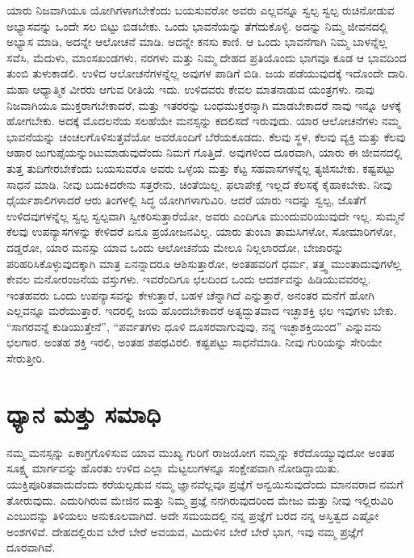 ಯಾರು ನಿಜವಾಗಿಯೂ ಯೋಗಿಗಳಾಗಬೇಕೆಂದು ಬಯಸುವರೋ ಅವರು ಎಲ್ಲವನ್ನೂ ಸ್ವಲ್ಪ ಸ್ವಲ್ಪ ರುಚಿನೋಡುವ ಅಭ್ಯಾಸವನ್ನು ಒಂದೇ ಸಲ ಬಿಟ್ಟು ಬಿಡಬೇಕು. ಒಂದು ಭಾವನೆಯನ್ನು ತೆಗೆದುಕೊಳ್ಳಿ. ಅದನ್ನು ನಿಮ್ಮ ಜೀವನದಲ್ಲಿ ಅಭ್ಯಾಸ ಮಾಡಿ, ಅದನ್ನೇ ಆಲೋಚನೆ ಮಾಡಿ. ಅದನ್ನೇ ಕನಸು ಕಾಣಿ. ಆ ಒಂದು ಭಾವನೆಗಾಗಿ ನಿಮ್ಮ ಬಾಳನ್ನೆಲ್ಲ ಸವೆಸಿ, ಮೆದುಳು, ಮಾಂಸಖಂಡಗಳು, ನರಗಳು ಮತ್ತು ನಿಮ್ಮ ದೇಹದ ಪ್ರತಿಯೊಂದು ಭಾಗವೂ ಕೂಡ ಆ ಭಾವದಿಂದ ತುಂಬಿ ತುಳುಕಾಡಲಿ. ಉಳಿದ ಆಲೋಚನೆಗಳನ್ನೆಲ್ಲ ಅವುಗಳ ಪಾಡಿಗೆ ಬಿಡಿ. ಜಯ ಪಡೆಯುವುದಕ್ಕೆ ಇದೊಂದೇ ದಾರಿ. ಮಹಾ ಆಧ್ಯಾತ್ಮಿಕ ವೀರರು ಆಗುವ ರೀತಿಯೆ ಇದು. ಉಳಿದವರು ಕೇವಲ ಮಾತನಾಡುವ ಯಂತ್ರಗಳು. ನಾವು ನಿಜವಾಗಿಯೂ ಮುಕ್ತರಾಗಬೇಕಾದರೆ, ಮತ್ತು ಇತರರನ್ನು ಬಂಧಮುಕ್ತರನ್ನಾಗಿ ಮಾಡಬೇಕಾದರೆ ನಾವು ಇನ್ನೂ ಆಳಕ್ಕೆ ಹೋಗಬೇಕು. ಅದಕ್ಕೆ ಮೊದಲನೆಯ ಸಲಹೆಯೇ ಮನಸ್ಸನ್ನು ಕದಲಿಸದೆ ಇರುವುದು. ಯಾರ ಆಲೋಚನೆಗಳು ನಮ್ಮ ಭಾವನೆಯನ್ನು ಚಂಚಲಗೊಳಿಸುತ್ತವೆಯೋ ಅವರೊಂದಿಗೆ ಬೆರೆಯಕೂಡದು. ಕೆಲವು ಸ್ಥಳ, ಕೆಲವು ವ್ಯಕ್ತಿ ಮತ್ತು ಕೆಲವು ಆಹಾರ ಜುಗುಪ್ಸೆಯನ್ನುಂಟುಮಾಡುವುದೆಂದು ನಿಮಗೆ ಗೊತ್ತಿದೆ. ಅವುಗಳಿಂದ ದೂರವಾಗಿ, ಯಾರು ಈ ಜೀವನದಲ್ಲಿ ತುತ್ತ ತುದಿಗೇರಬೇಕೆಂದು ಬಯಸುವರೊ ಅವರು ಒಳ್ಳೆಯ ಮತ್ತು ಕೆಟ್ಟ ಸಹವಾಸಗಳನ್ನೆಲ್ಲ ತ್ಯಜಿಸಬೇಕು. ಕಷ್ಟಪಟ್ಟು ಸಾಧನೆ ಮಾಡಿ. ನೀವು ಬದುಕಿದರೇನು ಸತ್ತರೇನು, ಚಿಂತೆಯಿಲ್ಲ. ಫಲಾಪೇಕ್ಷೆ ಇಲ್ಲದೆ ಕೆಲಸಕ್ಕೆ ಕೈಹಾಕಬೇಕು. ನೀವು ಧೈರ್ಯಶಾಲಿಗಳಾದರೆ ಆರು ತಿಂಗಳಲ್ಲಿ ಸಿದ್ಧ ಯೋಗಿಗಳಾಗುವಿರಿ. ಆದರೆ ಯಾರು ಇದನ್ನು ಸ್ವಲ್ಪ, ಜೊತೆಗೆ ಉಳಿದವುಗಳನ್ನೆಲ್ಲ ಸ್ವಲ್ಪ ಸ್ವಲ್ಪವಾಗಿ ಸ್ವೀಕರಿಸುತ್ತಾರೆಯೋ, ಅವರು ಎಂದಿಗೂ ಮುಂದುವರಿಯುವುದೇ ಇಲ್ಲ. ಸುಮ್ಮನೆ ಕೆಲವು ಉಪನ್ಯಾಸಗಳನ್ನು ಕೇಳಿದರೆ ಏನೂ ಪ್ರಯೋಜನವಿಲ್ಲ. ಯಾರು ತುಂಬಾ ತಾಮಸಿಗಳೋ, ಸೋಮಾರಿಗಳೋ, ದಡ್ಡರೋ, ಯಾರ ಮನಸ್ಸು ಯಾವ ಒಂದು ಆಲೋಚನೆಯ ಮೇಲೂ ನಿಲ್ಲಲಾರದೋ, ಬೇಜಾರನ್ನು ಪರಿಹರಿಸಿಕೊಳ್ಳುವುದಕ್ಕಾಗಿ ಮಾತ್ರ ಏನನ್ನಾದರೂ ಆಶಿಸುತ್ತಾರೋ, ಅಂತಹವರಿಗೆ ಧರ್ಮ, ತತ್ತ್ವ ಮುಂತಾದುವುಗಳೆಲ್ಲ ಕೇವಲ ಮನೋರಂಜನೆಯ ವಸ್ತುಗಳು. ಇವರೆಂದಿಗೂ ಛಲದಿಂದ ಒಂದು ಆದರ್ಶವನ್ನು ಹಿಡಿಯುವವರಲ್ಲ. ಇಂತಹವರು ಒಂದು ಉಪನ್ಯಾಸವನ್ನು ಕೇಳುತ್ತಾರೆ, ಬಹಳ ಚೆನ್ನಾಗಿದೆ ಎನ್ನುತ್ತಾರೆ, ಅನಂತರ ಮನೆಗೆ ಹೋಗಿ ಎಲ್ಲವನ್ನೂ ಮರೆಯುತ್ತಾರೆ. ಇದರಲ್ಲಿ ಜಯ ಹೊಂದಬೇಕಾದರೆ ಅತ್ಯದ್ಭುತವಾದ ಇಚ್ಛಾಶಕ್ತಿ ಛಲ ಇವುಗಳು ಬೇಕು. “ಸಾಗರವನ್ನೆ ಕುಡಿಯುತ್ತೇನೆ”, “ಪರ್ವತಗಳು ಧೂಳಿ ದೂಸರವಾಗುವುವು, ನನ್ನ ಇಚ್ಛಾಶಕ್ತಿಯಿಂದ” ಎನ್ನುವನು ಛಲಗಾರ. ಅಂತಹ ಶಕ್ತಿ ಇರಲಿ, ಅಂತಹ ಶಪಥವಿರಲಿ. ಕಷ್ಟಪಟ್ಟು ಸಾಧನೆಮಾಡಿ. ನೀವು ಗುರಿಯನ್ನು ಸೇರಿಯೇ ಸೇರುತ್ತೀರಿ.

\chapter{ಧ್ಯಾನ ಮತ್ತು ಸಮಾಧಿ}

ನಮ್ಮ ಮನಸ್ಸನ್ನು ಏಕಾಗ್ರಗೊಳಿಸುವ ಯಾವ ಮುಖ್ಯ ಗುರಿಗೆ ರಾಜಯೋಗ ನಮ್ಮನ್ನು ಕರೆದೊಯ್ಯುವುದೋ ಅಂತಹ ಸೂಕ್ಷ್ಮ ಮಾರ್ಗವನ್ನು ಹೊರತು ಉಳಿದ ಎಲ್ಲಾ ಮೆಟ್ಟಲುಗಳನ್ನೂ ಸಂಕ್ಷೇಪವಾಗಿ ನೋಡಿದ್ದಾಯಿತು. ಯುಕ್ತಿಪೂರಿತವಾದುದೆಂದು ಕರೆಯಲ್ಪಡುವ ನಮ್ಮ ಜ್ಞಾನವೆಲ್ಲವೂ ಪ್ರಜ್ಞೆಗೆ ಅನ್ವಯಿಸುವುದೆಂದು ಮಾನವರಾದ ನಮಗೆ ತೋರುವುದು. ಎದುರಿಗಿರುವ ಮೇಜಿನ ಮತ್ತು ನಿಮ್ಮ ಪ್ರಜ್ಞೆ ನನಗಿರುವುದರಿಂದ ಮೇಜು ಮತ್ತು ನೀವು ಇಲ್ಲಿರುವಿರಿ ಎಂಬುದನ್ನು ತಿಳಿಯಲು ಅನುಕೂಲವಾಗಿದೆ. ಅದೇ ಸಮಯದಲ್ಲಿ ನನ್ನ ಪ್ರಜ್ಞೆಗೆ ಬರದ ನನ್ನ ಅಸ್ತಿತ್ವದ ಎಷ್ಟೋ ಅಂಶಗಳಿವೆ. ದೇಹದಲ್ಲಿರುವ ಬೇರೆ ಬೇರೆ ಅವಯವ, ಮಿದುಳಿನ ಬೇರೆ ಬೇರೆ ಭಾಗ, ಇವು ನಮ್ಮ ಪ್ರಜ್ಞೆಗೆ ದೂರವಾಗಿವೆ. 


